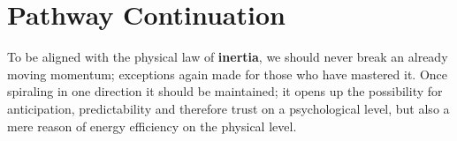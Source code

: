 \section{Pathway Continuation}\label{sec:pathway-continuation}

To be aligned with the physical law of \textbf{inertia}, we should never break an already moving momentum; exceptions again made for those who have mastered it.
Once spiraling in one direction it should be maintained; it opens up the possibility for anticipation, predictability and therefore trust on a psychological level, but also a mere reason of energy efficiency on the physical level.

